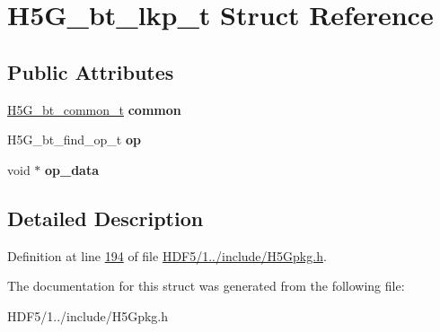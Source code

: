 \hypertarget{struct_h5_g__bt__lkp__t}{}\section{H5\+G\+\_\+bt\+\_\+lkp\+\_\+t Struct Reference}
\label{struct_h5_g__bt__lkp__t}
\subsection*{Public Attributes}
\begin{DoxyCompactItemize}
\item 
\mbox{\label{struct_h5_g__bt__lkp__t_ad6b28c71d8353a46a914468ffb1f39e4}} 
\hyperlink{struct_h5_g__bt__common__t}{H5\+G\+\_\+bt\+\_\+common\+\_\+t} {\bfseries common}
\item 
\mbox{\label{struct_h5_g__bt__lkp__t_af8d75a179ad3e4711c5b8398a0257a7a}} 
H5\+G\+\_\+bt\+\_\+find\+\_\+op\+\_\+t {\bfseries op}
\item 
\mbox{\label{struct_h5_g__bt__lkp__t_a75c7ad008ec8e60b6d8a5be2a117a772}} 
void $\ast$ {\bfseries op\+\_\+data}
\end{DoxyCompactItemize}


\subsection{Detailed Description}


Definition at line \hyperlink{_h_d_f5_21_810_81_2include_2_h5_gpkg_8h_source_l00194}{194} of file \hyperlink{_h_d_f5_21_810_81_2include_2_h5_gpkg_8h_source}{H\+D\+F5/1../include/\+H5\+Gpkg.\+h}.



The documentation for this struct was generated from the following file\+:\begin{DoxyCompactItemize}
\item 
H\+D\+F5/1../include/\+H5\+Gpkg.\+h\end{DoxyCompactItemize}
